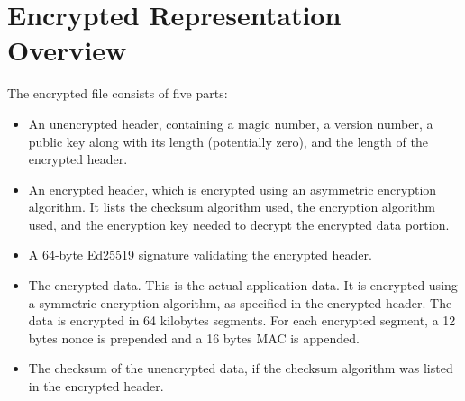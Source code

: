 \section{Encrypted Representation Overview}
The encrypted file consists of five parts:

\begin{itemize}
\item An unencrypted header, containing a magic number, a version
  number, a public key along with its length (potentially zero), and
  the length of the encrypted header.
\item An encrypted header, which is encrypted using an asymmetric
  encryption algorithm. 
  It lists the checksum algorithm used, the encryption algorithm used,
  and the encryption key needed to decrypt the encrypted data portion.
\item A 64-byte Ed25519 signature validating the encrypted header.
\item The encrypted data.
  This is the actual application data.
  It is encrypted using a symmetric encryption algorithm, as specified
  in the encrypted header.
  The data is encrypted in 64 kilobytes segments. For each encrypted
  segment, a 12 bytes nonce is prepended and a 16 bytes MAC is appended.
\item The checksum of the unencrypted data, if the checksum algorithm
  was listed in the encrypted header.
\end{itemize}
